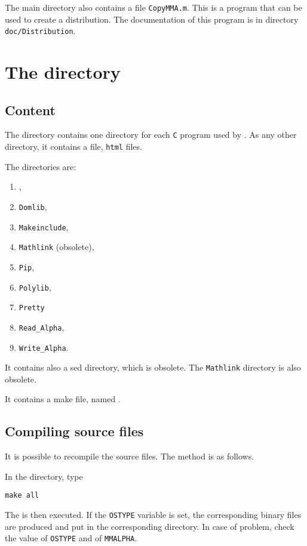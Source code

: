 \documentclass[11pt]{article}
\begin{document}
The main directory also contains a file \texttt{CopyMMA.m}. This is a 
\mma{} program that can be used to create a distribution. The documentation 
of this program is in directory \texttt{doc/Distribution}. 

\section{The \sources{} directory}
\label{sources}
\subsection{Content}
The \sources{} directory contains one directory for each 
\texttt{C} program used by \mmalfa{}. As any other directory, it contains
a \readme{} file, \texttt{html} files. 

\newcommand{\domlib}{\texttt{Domlib}}
\newcommand{\makeinclude}{\texttt{Makeinclude}}
\newcommand{\mathlink}{\texttt{Mathlink}}
\newcommand{\pip}{\texttt{Pip}}
\newcommand{\polylib}{\texttt{Polylib}}
\newcommand{\pretty}{\texttt{Pretty}}
\newcommand{\readalfa}{\texttt{Read\_Alpha}}
\newcommand{\writealfa}{\texttt{Write\_Alpha}}
The directories are:
\begin{enumerate}
\item \cgen{},
\item \domlib{},
\item \makeinclude{},
\item \mathlink{} (obsolete),
\item \pip{},
\item \polylib{},
\item \pretty{}
\item \readalfa{},
\item \writealfa{}.
\end{enumerate} 

It contains also a sed directory, which is obsolete. The \mathlink{} directory is
also obsolete.

It contains a make file, named \makefile{}. 

\subsection{Compiling source files}
It is possible to recompile the source files. The 
method is as follows. 

\newcommand{\envostype}{\texttt{OSTYPE}}
\newcommand{\envmmalpha}{\texttt{MMALPHA}}
\newcommand{\vardir}{\texttt{DIR}}


In the \sources{} directory, type
\begin{verbatim}
make all
\end{verbatim}
The  \makefile{} is then executed. If the \envostype{} variable is set, 
the corresponding binary files are produced and put in the 
corresponding \bin{} directory. In case of problem, check the
value of \envostype{} and of \envmmalpha{}. 
\end{document}

